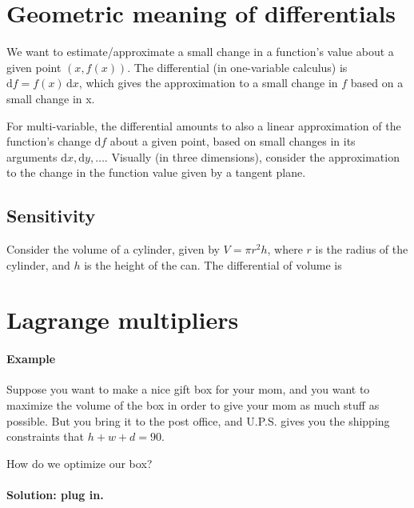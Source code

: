 \documentclass[11pt]{article}
\newcommand{\diff}{\mathrm d}
\begin{document}
\section*{Geometric meaning of differentials}

We want to estimate/approximate a small change in a function's value about a given point \((x, f(x))\). The differential (in one-variable calculus) is \(\diff f = f(x) \, \diff x\), which gives the approximation to a small change in \(f\) based on a small change in x.

For multi-variable, the differential amounts to also a linear approximation of the function's change \(\diff f\) about a given point, based on small changes in its arguments \(\diff x, \diff y, \dots\). Visually (in three dimensions), consider the approximation to the change in the function value given by a tangent plane.

\subsection*{Sensitivity}

Consider the volume of a cylinder, given by \(V = \pi r^2 h\), where \(r\) is the radius of the cylinder, and \(h\) is the height of the can. The differential of volume is 

\section*{Lagrange multipliers}

\paragraph{Example}

Suppose you want to make a nice gift box for your mom, and you want to maximize the volume of the box in order to give your mom as much stuff as possible. But you bring it to the post office, and U.P.S. gives you the shipping constraints that \(h+w+d = 90\). 

How do we optimize our box?

\paragraph{Solution: plug in.}
\end{document}
